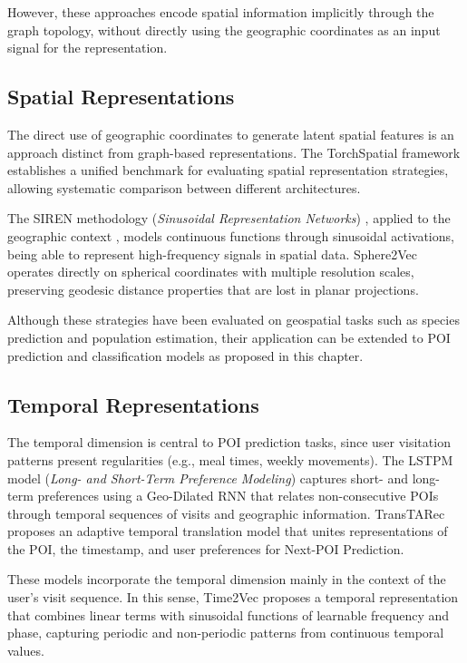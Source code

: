 However, these approaches encode spatial information implicitly through the graph topology, without directly using the geographic coordinates as an input signal for the representation.

\subsection{Spatial Representations}

The direct use of geographic coordinates to generate latent spatial features is an approach distinct from graph-based representations. The TorchSpatial framework \cite{wu2024torchspatial} establishes a unified benchmark for evaluating spatial representation strategies, allowing systematic comparison between different architectures.

The SIREN methodology (\textit{Sinusoidal Representation Networks}) \cite{sitzmann2020implicit}, applied to the geographic context \cite{russwurm2024geographiclocationencodingspherical}, models continuous functions through sinusoidal activations, being able to represent high-frequency signals in spatial data. Sphere2Vec \cite{mai2023sphere2vecgeneralpurposelocationrepresentation} operates directly on spherical coordinates with multiple resolution scales, preserving geodesic distance properties that are lost in planar projections.

Although these strategies have been evaluated on geospatial tasks such as species prediction and population estimation, their application can be extended to POI prediction and classification models as proposed in this chapter.

\subsection{Temporal Representations}

The temporal dimension is central to POI prediction tasks, since user visitation patterns present regularities (e.g., meal times, weekly movements). The LSTPM model (\textit{Long- and Short-Term Preference Modeling}) \cite{sun2020go} captures short- and long-term preferences using a Geo-Dilated RNN that relates non-consecutive POIs through temporal sequences of visits and geographic information. TransTARec \cite{sun2024transtarec} proposes an adaptive temporal translation model that unites representations of the POI, the timestamp, and user preferences for Next-POI Prediction.

These models incorporate the temporal dimension mainly in the context of the user's visit sequence. In this sense, Time2Vec \cite{kazemi2019time2vec} proposes a temporal representation that combines linear terms with sinusoidal functions of learnable frequency and phase, capturing periodic and non-periodic patterns from continuous temporal values.

